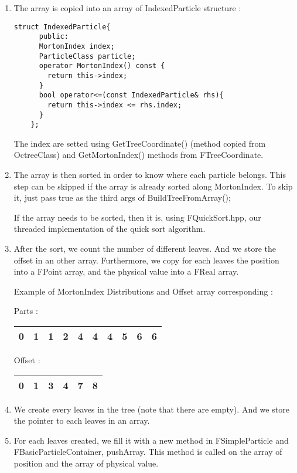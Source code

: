 \documentclass[12pt,letterpaper,titlepage]{article}
\begin{document}
\begin{enumerate}
\item The array is copied into an array of IndexedParticle structure :
  \begin{lstlisting}[frame=single]
    struct IndexedParticle{
      public:
      MortonIndex index;
      ParticleClass particle;
      operator MortonIndex() const {
        return this->index;
      }
      bool operator<=(const IndexedParticle& rhs){
        return this->index <= rhs.index;
      }
    };
    \end{lstlisting}
    The index are setted using GetTreeCoordinate() (method copied from
    OctreeClass) and GetMortonIndex() methods from FTreeCoordinate.

  \item The array is then sorted in order to know where each particle
    belongs. This step can be skipped if the array is already sorted
    along MortonIndex. To skip it, just pass true as the third args of
    BuildTreeFromArray();

    If the array needs to be sorted, then it is, using FQuickSort.hpp,
    our threaded implementation of the quick sort algorithm.

  \item After the sort, we count the number of different leaves. And
    we store the offset in an other array. Furthermore, we copy for
    each leaves the position into a FPoint array, and the physical
    value into a FReal array.

    Example of MortonIndex Distributions and Offset array corresponding :

    Parts :
    \begin{tabular}{|c|c|c|c|c|c|c|c|c|c|}
      \hline
      0&1&1&2&4&4&4&5&6&6\\
      \hline
    \end{tabular}

    Offset :
    \begin{tabular}{|c|c|c|c|c|c|}
      \hline
      0&1&3&4&7&8\\
      \hline
    \end{tabular}

  \item We create every leaves in the tree (note that there are
    empty). And we store the pointer to each leaves in an array.

  \item For each leaves created, we fill it with a new method in
    FSimpleParticle and FBasicParticleContainer, pushArray. This
    method is called on the array of position and the array of
    physical value.

\end{enumerate}
\end{document}
